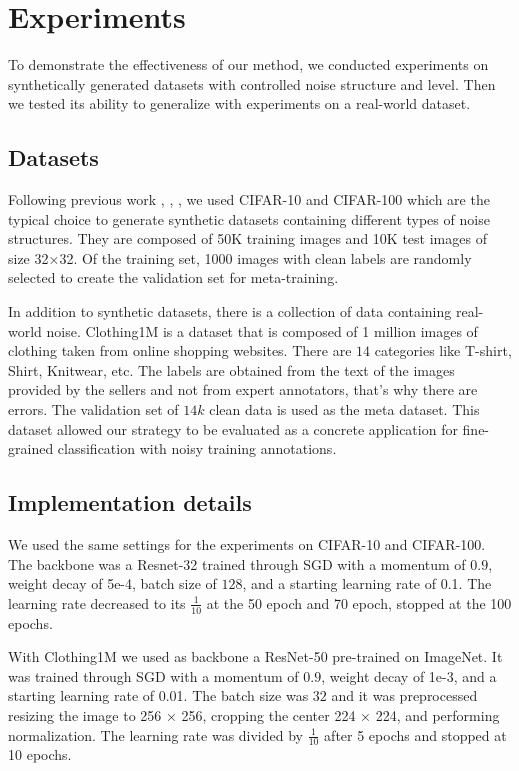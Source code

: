 \documentclass[runningheads]{llncs}
\begin{document}
	
	\section{Experiments}


To demonstrate the effectiveness of our method, we conducted experiments on synthetically generated datasets with controlled noise structure and level. Then we tested its ability to generalize with experiments on a real-world dataset.
	


	
	\subsection{Datasets}
	
	Following previous work \cite{shu2019meta}, \cite{ren2018learning}, \cite{jiang2018mentornet}, we used CIFAR-10 and CIFAR-100 which are the typical choice to generate synthetic datasets containing different types of noise structures. They are composed of 50K training images and 10K test images of size 32×32. Of the training set, 1000 images with clean labels are randomly selected to create the validation set for meta-training.
	
	In addition to synthetic datasets, there is a collection of data containing real-world noise. Clothing1M \cite{xiao2015learning} is a dataset that is composed of 1 million images of clothing taken from online shopping websites. There are $14$ categories like T-shirt, Shirt, Knitwear, etc. The labels are obtained from the text of the images provided by the sellers and not from expert annotators, that's why there are errors. The validation set of $14k$ clean data is used as the meta dataset. This dataset allowed our strategy to be evaluated as a concrete application for fine-grained classification with noisy training annotations.
	
	\subsection{Implementation details}
	
	We used the same settings for the experiments on CIFAR-10 and CIFAR-100. The backbone was a Resnet-32 trained through SGD with a momentum of $0.9$, weight decay of 5e-4, batch size of $128$, and a starting learning rate of 0.1. The learning rate decreased to its $\frac{1}{10}$ at the 50 epoch and 70 epoch, stopped at the 100 epochs.
	
	With Clothing1M we used as backbone a ResNet-50 pre-trained on ImageNet. It was trained through SGD with a momentum of $0.9$, weight decay of 1e-3, and a starting learning rate of 0.01. The batch size was $32$ and it was preprocessed resizing the image to 256 × 256, cropping the center 224 × 224, and performing normalization. The learning rate was divided by $\frac{1}{10}$ after 5 epochs and stopped at 10 epochs.
	
\end{document}
